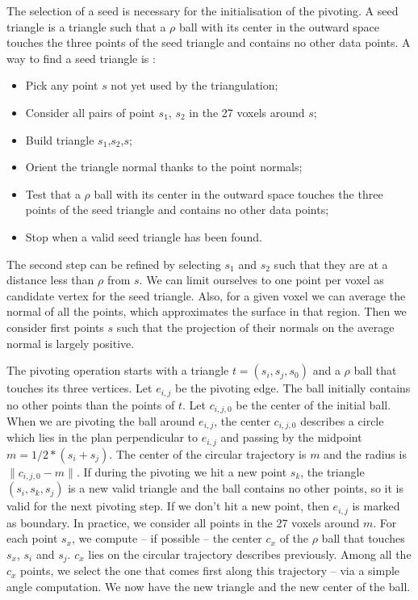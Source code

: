 \documentclass[12pt]{article}
\begin{document}
The selection of a seed is necessary for the initialisation of the pivoting. A seed triangle is a triangle such that a $\rho$ ball with its center in the outward space touches the three points of the seed triangle and contains no other data points. A way to find a seed triangle is :
\begin{itemize}
\item Pick any point $s$ not yet used by the triangulation;
\item Consider all pairs of point $s_1$, $s_2$ in the 27 voxels around $s$;
\item Build triangle $s_1$,$s_2$,$s$;
\item Orient the triangle normal thanks to the point normals;
\item Test that a $\rho$ ball with its center in the outward space touches the three points of the seed triangle and contains no other data points;
\item Stop when a valid seed triangle has been found.
\end{itemize}

The second step can be refined by selecting $s_1$ and $s_2$ such that they are at a distance less than $\rho$ from $s$. We can limit ourselves to one point per voxel as candidate vertex for the seed triangle. Also, for a given voxel we can average the normal of all the points, which approximates the surface in that region. Then we consider first points $s$ such that the projection of their normals on the average normal is largely positive.

The pivoting operation starts with a triangle $t =(s_i, s_j, s_0)$ and a $\rho$ ball that touches its three vertices. Let $e_{i,j}$ be the pivoting edge. The ball initially contains no other points than the points of $t$. Let $c_{i,j,0}$ be the center of the initial ball. When we are pivoting the ball around $e_{i,j}$, the center $c_{i,j,0}$ describes a circle which lies in the plan perpendicular to $e_{i,j}$ and passing by the midpoint $m = 1/2 * (s_i + s_j)$. The center of the circular trajectory is $m$ and the radius is $\| c_{i,j,0} - m \|$. If during the pivoting we hit a new point $s_k$, the triangle $(s_i, s_k, s_j)$ is a new valid triangle and the ball contains no other points, so it is valid for the next pivoting step. If we don't hit a new point, then $e_{i,j}$ is marked as boundary.
In practice, we consider all points in the 27 voxels around $m$. For each point $s_x$, we compute -- if possible -- the center $c_x$ of the $\rho$ ball that touches $s_x$, $s_i$ and $s_j$. $c_x$ lies on the circular trajectory describes previously. Among all the $c_x$ points, we select the one that comes first along this trajectory -- via a simple angle computation. We now have the new triangle and the new center of the ball.
\end{document}
